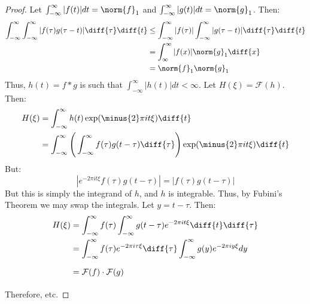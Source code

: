         \begin{proof}
        Let $\int_{-\infty}^{\infty} |f(t)|dt = \norm{f}_{1}$ and $\int_{-\infty}^{\infty} |g(t)|dt = \norm{g}_{1}$. Then:
        \begin{align*}
            \int_{-\infty}^{\infty}\int_{-\infty}^{\infty}
                |f(\tau)g(\tau-t)|\diff{\tau}\diff{t}
            &\leq\int_{-\infty}^{\infty}
                |f(\tau)|\int_{-\infty}^{\infty}
                |g(\tau-t)|\diff{\tau}\diff{t}\\
            &=\int_{\infty}^{\infty}
                |f(x)|\norm{g}_{1}\diff{x}\\
            &=\norm{f}_{1}\norm{g}_{1}
        \end{align*}
        Thus, $h(t)=f*g$ is such that
        $\int_{-\infty}^{\infty} |h(t)|dt < \infty$.
        Let $H(\xi) = \mathcal{F}(h)$. Then:
        \begin{align}
            H(\xi)&=
                \int_{-\infty}^{\infty}
                h(t)\exp(\minus{2}\pi{i}t\xi)\diff{t}\\
            &=\int_{-\infty}^{\infty}
                \Bigg(
                    \int_{-\infty}^{\infty}
                    f(\tau)g(t-\tau)\diff{\tau}
                \Bigg)\exp(\minus{2}\pi{i}t\xi)\diff{t}
        \end{align}
        But:
        \begin{equation}
            |e^{-2\pi{i}t\xi}f(\tau)g(t-\tau)|
            =|f(\tau)g(t-\tau)|
        \end{equation}
        But this is simply the integrand of $h$, and $h$
        is integrable. Thus, by Fubini's Theorem we may
        swap the integrals. Let $y=t-\tau$. Then:
        \begin{subequations}
            \begin{align}
                H(\xi)&=
                    \int_{-\infty}^{\infty}f(\tau)
                    \int_{-\infty}^{\infty}g(t-\tau)
                    e^{-2\pi{i}t\xi}\diff{t}\diff{\tau}\\
                &=\int_{-\infty}^{\infty}f(\tau)
                    e^{-2\pi{i}\tau\xi}\diff{\tau}
                    \int_{-\infty}^{\infty}g(y)
                    e^{-2\pi{i}y\xi}dy\\
                &=\mathcal{F}(f)\cdot\mathcal{F}(g)
                    \vphantom{\int_{-\infty}^{\infty}}
            \end{align}
        \end{subequations}
        Therefore, etc.
        \end{proof}
